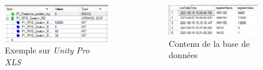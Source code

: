 \begin{frame}[allowframebreaks]
            \begin{columns}[T]
                \begin{column}{0.5\textwidth}
                    \begin{figure}[H]
                        \centering
                        \includegraphics[width=1\linewidth]{images/regUnity.png}
                        \caption*{Exemple sur \textit{Unity Pro XLS}}
                    \end{figure}
                \end{column}\hfill
                \begin{column}{0.5\textwidth}
                    \begin{figure}[H]
                        \centering
                        \includegraphics[width=1\linewidth]{images/exempleSQLSave.png}
                        \caption*{Contenu de la base de données}
                    \end{figure}
                \end{column}
            \end{columns}
        \end{frame}
%
